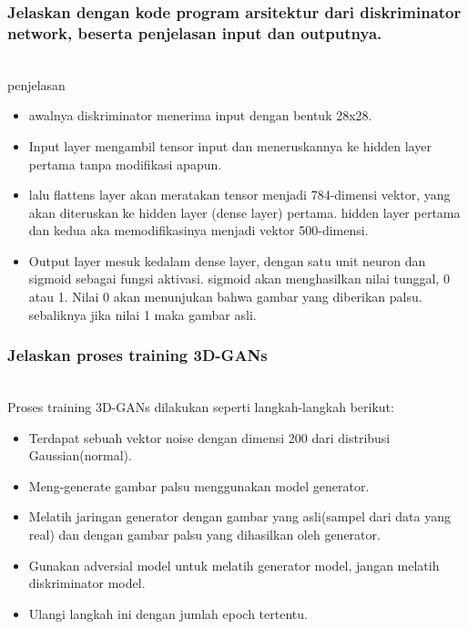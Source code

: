 \subsubsection{Jelaskan dengan kode program arsitektur dari diskriminator network, beserta penjelasan input dan outputnya.}
\hfill\\

penjelasan
\begin{itemize}
	\item awalnya diskriminator menerima input dengan bentuk 28x28.
	\item Input layer mengambil tensor input dan meneruskannya ke hidden layer pertama tanpa modifikasi apapun.
	\item lalu flattens layer akan meratakan tensor menjadi 784-dimensi vektor, yang akan diteruskan ke hidden layer (dense layer) pertama. hidden layer pertama dan kedua aka memodifikasinya menjadi vektor 500-dimensi.
	\item Output layer mesuk kedalam dense layer, dengan satu unit neuron dan sigmoid sebagai fungsi aktivasi.  sigmoid akan menghasilkan nilai tunggal, 0 atau 1. Nilai 0 akan menunjukan bahwa gambar yang diberikan palsu. sebaliknya jika nilai 1 maka gambar asli.
\end{itemize}

\subsubsection{Jelaskan proses training 3D-GANs}
\hfill\\
Proses training 3D-GANs dilakukan seperti langkah-langkah berikut:
\begin{itemize}
	\item Terdapat sebuah vektor noise dengan dimensi 200 dari distribusi Gaussian(normal).
	\item Meng-generate gambar palsu menggunakan model generator.
	\item Melatih jaringan generator dengan gambar yang asli(sampel dari data yang real) dan dengan gambar palsu yang dihasilkan oleh generator.
	\item Gunakan adversial model untuk melatih generator model, jangan melatih diskriminator model.
	\item Ulangi langkah ini dengan jumlah epoch tertentu.
\end{itemize}
	

